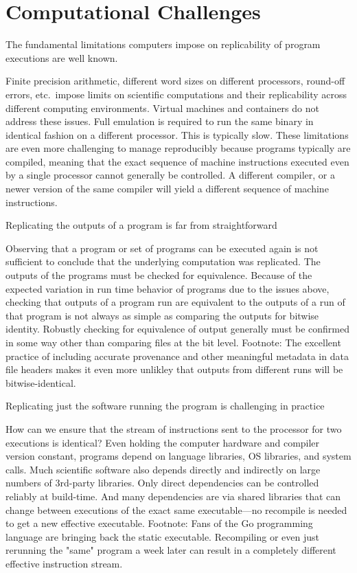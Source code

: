 \section{Computational Challenges}\label{sec-limitations}

		The fundamental limitations computers impose on replicability of program executions are well known.

			Finite precision arithmetic, different word sizes on different processors, round-off errors, etc.\  impose limits on scientific computations and
				their replicability across different computing environments.
			Virtual machines and containers do not address these issues. Full emulation is required to run the same binary in identical fashion
				on a different processor.  This is typically slow.
			These limitations are even more challenging to manage reproducibly because programs typically are compiled, meaning that the
				exact sequence of machine instructions executed even by a single processor cannot generally be controlled.  A different compiler,
				or a newer version of the same compiler will yield a different sequence of machine instructions.

		Replicating the outputs of a program is far from straightforward

			Observing that a program or set of programs can be executed again is not sufficient to conclude that the underlying computation
				was replicated.  The outputs of the programs must be checked for equivalence.
			Because of the expected variation in run time behavior of programs due to the issues above, checking that outputs of a program
				run are equivalent to the outputs of a run of that program is not always as simple as
				comparing the outputs for bitwise identity.
			Robustly checking for equivalence of output generally must be confirmed in some way other than comparing files at the bit level.
			Footnote: The excellent practice of including accurate provenance and other meaningful metadata in data file headers makes it
				even more unlikley that outputs from different runs will be bitwise-identical.

		Replicating just the software running the program is challenging in practice

			How can we ensure that the stream of instructions sent to the processor for two executions is identical?
			Even holding the computer hardware and compiler version constant, programs depend on language libraries, OS libraries, and system calls.
			Much scientific software also depends directly and indirectly on large numbers of 3rd-party libraries.
			Only direct dependencies can be controlled reliably at build-time.  And many dependencies are via shared libraries that can change between executions
				of the exact same executable---no recompile is needed to get a new effective executable.
			Footnote:  Fans of the Go programming language are bringing back the static executable.
			Recompiling or even just rerunning the "same" program a week later can result in a completely different effective instruction stream.

